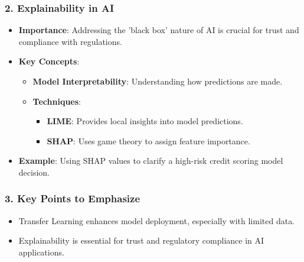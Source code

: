 \documentclass[aspectratio=169]{beamer}
\begin{document}
\begin{frame}
    \frametitle{2. Explainability in AI}
    \begin{itemize}
        \item \textbf{Importance}: Addressing the 'black box' nature of AI is crucial for trust and compliance with regulations.
        \item \textbf{Key Concepts}:
        \begin{itemize}
            \item \textbf{Model Interpretability}: Understanding how predictions are made.
            \item \textbf{Techniques}:
                \begin{itemize}
                    \item \textbf{LIME}: Provides local insights into model predictions.
                    \item \textbf{SHAP}: Uses game theory to assign feature importance.
                \end{itemize}
        \end{itemize}
        \item \textbf{Example}: Using SHAP values to clarify a high-risk credit scoring model decision.
    \end{itemize}
\end{frame}

\begin{frame}[fragile]
    \frametitle{3. Key Points to Emphasize}
    \begin{itemize}
        \item Transfer Learning enhances model deployment, especially with limited data.
        \item Explainability is essential for trust and regulatory compliance in AI applications.
    \end{itemize}
\end{frame}
\end{document}
